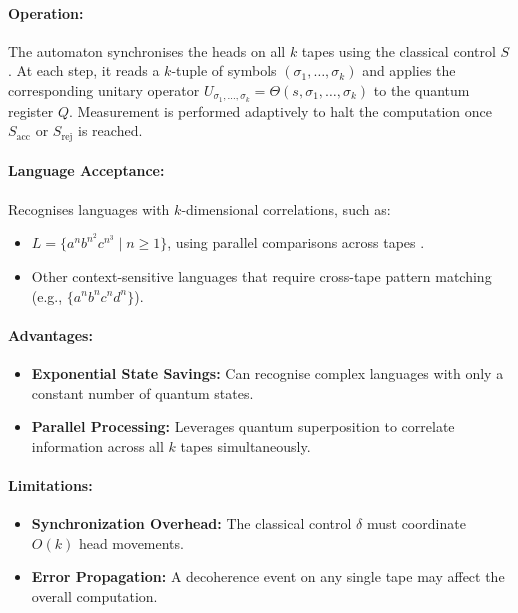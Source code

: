 \paragraph{Operation:}  
The automaton synchronises the heads on all \( k \) tapes using the classical control \( S \). At each step, it reads a \( k \)-tuple of symbols \((\sigma_1, \dots, \sigma_k)\) and applies the corresponding unitary operator \( U_{\sigma_1, \dots, \sigma_k} = \Theta(s, \sigma_1, \dots, \sigma_k) \) to the quantum register \( Q \). Measurement is performed adaptively to halt the computation once \( S_{\text{acc}} \) or \( S_{\text{rej}} \) is reached.

\paragraph{Language Acceptance:}  
Recognises languages with \( k \)-dimensional correlations, such as:
\begin{itemize}
    \item \( L = \{a^n b^{n^2} c^{n^3} \mid n \geq 1\} \), using parallel comparisons across tapes \cite{zheng2012two}.
    \item Other context-sensitive languages that require cross-tape pattern matching (e.g., \( \{a^n b^n c^n d^n\} \)).
\end{itemize}

\paragraph{Advantages:}
\begin{itemize}
    \item \textbf{Exponential State Savings:} Can recognise complex languages with only a constant number of quantum states.
    \item \textbf{Parallel Processing:} Leverages quantum superposition to correlate information across all \( k \) tapes simultaneously.
\end{itemize}

\paragraph{Limitations:}
\begin{itemize}
    \item \textbf{Synchronization Overhead:} The classical control \( \delta \) must coordinate \( O(k) \) head movements.
    \item \textbf{Error Propagation:} A decoherence event on any single tape may affect the overall computation.
\end{itemize}

